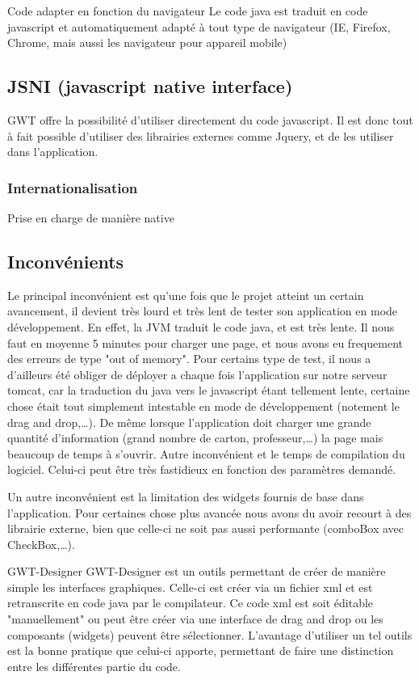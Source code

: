 Code adapter en fonction du navigateur
Le code java est traduit en code javascript et automatiquement adapté à tout type de navigateur (IE, Firefox, Chrome, mais aussi les navigateur pour appareil mobile)

\subsection{JSNI (javascript native interface)}
GWT offre la possibilité d'utiliser directement du code javascript. Il est donc tout à fait possible d'utiliser des librairies externes comme Jquery, et de les utiliser dans l'application.

 \subsubsection{Internationalisation}
Prise en charge de manière native

\subsection{Inconvénients}
Le principal inconvénient est qu'une fois que le projet atteint un certain avancement, il devient très lourd et très lent de tester son application en mode développement. En effet, la JVM traduit le code java, et est très lente. Il nous faut en moyenne 5 minutes pour charger une page, et nous avons eu frequement des erreurs de type "out of memory". Pour certains type de test, il nous a d'ailleurs été obliger de déployer a chaque fois l'application sur notre serveur tomcat, car la traduction du java vers le javascript étant tellement lente, certaine chose était tout simplement intestable en mode de développement (notement le drag and drop,…). De même lorsque l'application doit charger une grande quantité d'information (grand nombre de carton, professeur,…) la page mais beaucoup de temps à s'ouvrir.
Autre inconvénient et le temps de compilation du logiciel. Celui-ci peut être très fastidieux en fonction des paramètres demandé.
	
Un autre inconvénient est la limitation des widgets fournis de base dans l'application. Pour certaines chose plus avancée nous avons du avoir recourt à des librairie externe, bien que celle-ci ne soit pas aussi performante (comboBox avec CheckBox,…).

GWT-Designer
GWT-Designer est un outils permettant de créer de manière simple les interfaces graphiques. Celle-ci est créer via un fichier xml et est retranscrite en code java par le compilateur. Ce code xml est soit éditable "manuellement" ou peut être créer via une interface de drag and drop ou les composants (widgets) peuvent être sélectionner. L'avantage d'utiliser un tel outils est la bonne pratique que celui-ci apporte, permettant de faire une distinction entre les différentes partie du code.

